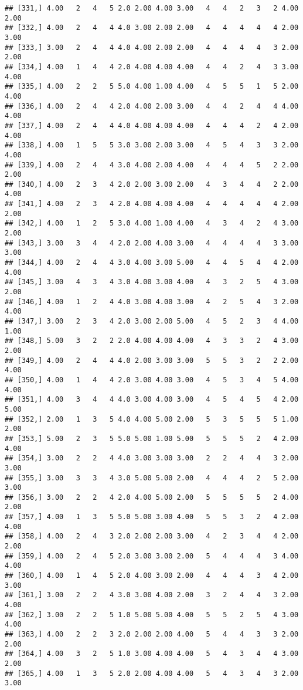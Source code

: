 \documentclass[]{article}
\begin{document}
\begin{verbatim}
## [331,] 4.00   2   4   5 2.0 2.00 4.00 3.00   4   4   2   3   2 4.00 2.00
## [332,] 4.00   2   4   4 4.0 3.00 2.00 2.00   4   4   4   4   4 2.00 3.00
## [333,] 3.00   2   4   4 4.0 4.00 2.00 2.00   4   4   4   4   3 2.00 2.00
## [334,] 4.00   1   4   4 2.0 4.00 4.00 4.00   4   4   2   4   3 3.00 4.00
## [335,] 4.00   2   2   5 5.0 4.00 1.00 4.00   4   5   5   1   5 2.00 4.00
## [336,] 4.00   2   4   4 2.0 4.00 2.00 3.00   4   4   2   4   4 4.00 4.00
## [337,] 4.00   2   4   4 4.0 4.00 4.00 4.00   4   4   4   2   4 2.00 4.00
## [338,] 4.00   1   5   5 3.0 3.00 2.00 3.00   4   5   4   3   3 2.00 4.00
## [339,] 4.00   2   4   4 3.0 4.00 2.00 4.00   4   4   4   5   2 2.00 2.00
## [340,] 4.00   2   3   4 2.0 2.00 3.00 2.00   4   3   4   4   2 2.00 4.00
## [341,] 4.00   2   3   4 2.0 4.00 4.00 4.00   4   4   4   4   4 2.00 2.00
## [342,] 4.00   1   2   5 3.0 4.00 1.00 4.00   4   3   4   2   4 3.00 2.00
## [343,] 3.00   3   4   4 2.0 2.00 4.00 3.00   4   4   4   4   3 3.00 3.00
## [344,] 4.00   2   4   4 3.0 4.00 3.00 5.00   4   4   5   4   4 2.00 4.00
## [345,] 3.00   4   3   4 3.0 4.00 3.00 4.00   4   3   2   5   4 3.00 2.00
## [346,] 4.00   1   2   4 4.0 3.00 4.00 3.00   4   2   5   4   3 2.00 4.00
## [347,] 3.00   2   3   4 2.0 3.00 2.00 5.00   4   5   2   3   4 4.00 1.00
## [348,] 5.00   3   2   2 2.0 4.00 4.00 4.00   4   3   3   2   4 3.00 2.00
## [349,] 4.00   2   4   4 4.0 2.00 3.00 3.00   5   5   3   2   2 2.00 4.00
## [350,] 4.00   1   4   4 2.0 3.00 4.00 3.00   4   5   3   4   5 4.00 4.00
## [351,] 4.00   3   4   4 4.0 3.00 4.00 3.00   4   5   4   5   4 2.00 5.00
## [352,] 2.00   1   3   5 4.0 4.00 5.00 2.00   5   3   5   5   5 1.00 2.00
## [353,] 5.00   2   3   5 5.0 5.00 1.00 5.00   5   5   5   2   4 2.00 4.00
## [354,] 3.00   2   2   4 4.0 3.00 3.00 3.00   2   2   4   4   3 2.00 3.00
## [355,] 3.00   3   3   4 3.0 5.00 5.00 2.00   4   4   4   2   5 2.00 3.00
## [356,] 3.00   2   2   4 2.0 4.00 5.00 2.00   5   5   5   5   2 4.00 2.00
## [357,] 4.00   1   3   5 5.0 5.00 3.00 4.00   5   5   3   2   4 2.00 4.00
## [358,] 4.00   2   4   3 2.0 2.00 2.00 3.00   4   2   3   4   4 2.00 2.00
## [359,] 4.00   2   4   5 2.0 3.00 3.00 2.00   5   4   4   4   3 4.00 4.00
## [360,] 4.00   1   4   5 2.0 4.00 3.00 2.00   4   4   4   3   4 2.00 3.00
## [361,] 3.00   2   2   4 3.0 3.00 4.00 2.00   3   2   4   4   3 2.00 4.00
## [362,] 3.00   2   2   5 1.0 5.00 5.00 4.00   5   5   2   5   4 3.00 4.00
## [363,] 4.00   2   2   3 2.0 2.00 2.00 4.00   5   4   4   3   3 2.00 2.00
## [364,] 4.00   3   2   5 1.0 3.00 4.00 4.00   5   4   3   4   4 3.00 2.00
## [365,] 4.00   1   3   5 2.0 2.00 4.00 4.00   5   4   3   4   3 2.00 3.00

\end{verbatim}
\end{document}
